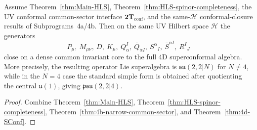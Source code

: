 \begin{corollary}
\label{cor:Main-postHLS-superconf}
Assume Theorem~\ref{thm:Main-HLS},
Theorem~\ref{thm:HLS-spinor-completeness},
the UV conformal common-sector interface \(\mathbf{2T}_{\mathrm{conf}}\), and the
same-\(\mathcal H\) conformal-closure results of Subprograms~4a/4b. Then on the same UV Hilbert space
\(\mathcal H\) the generators
\[
P_\mu,\ M_{\mu\nu},\ D,\ K_\mu,\ Q_\alpha^I,\ \bar Q_{\dot\alpha I},\
S^\alpha{}_I,\ \bar S^{\dot\alpha I},\ R^I{}_J
\]
close on a dense common invariant core to the full \(4\)D superconformal algebra.
More precisely, the resulting operator Lie superalgebra is
\(\mathfrak{su}(2,2|N)\) for \(N\neq 4\), while in the \(N=4\) case the standard
simple form is obtained after quotienting the central \(\mathfrak u(1)\), giving
\(\mathfrak{psu}(2,2|4)\).
\end{corollary}

\begin{proof}
Combine Theorem~\ref{thm:Main-HLS},
Theorem~\ref{thm:HLS-spinor-completeness},
Theorem~\ref{thm:4b-narrow-common-sector}, and
Theorem~\ref{thm:4d-SConf}.
\end{proof}
